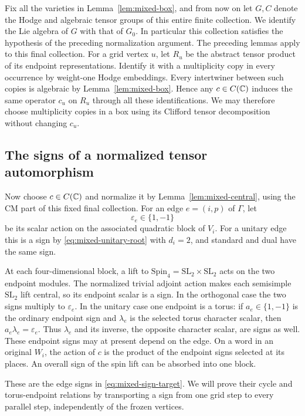 Fix all the varieties in Lemma~\ref{lem:mixed-box}, and from now on
let $G,C$ denote the Hodge and algebraic tensor groups of this entire
finite collection.  We identify the Lie algebra of $G$ with that
of $G_0$.  In particular this collection satisfies the hypothesis
of the preceding normalization argument.  The preceding lemmas apply
to this final collection.
For a grid vertex $u$, let $R_u$ be the abstract tensor product of
its endpoint representations.  Identify it with a multiplicity copy
in every occurrence by weight-one Hodge embeddings.  Every
intertwiner between such copies is algebraic by
Lemma~\ref{lem:mixed-box}.  Hence any $c\in C(\mathbb C)$ induces the
same operator $c_u$ on $R_u$ through all these identifications.
We may therefore choose multiplicity copies in a box using its
Clifford tensor decomposition without changing $c_u$.

\subsection{The signs of a normalized tensor automorphism}

Now choose $c\in C(\mathbb C)$ and normalize it by
Lemma~\ref{lem:mixed-central}, using the CM part of this fixed final
collection.  For an edge $e=(i,p)$ of $\Gamma$,
let
\[
 \varepsilon_e\in\{1,-1\}
\]
be its scalar action on the associated quadratic block of $V_i$.
For a unitary edge this is a sign by
\eqref{eq:mixed-unitary-root} with $d_i=2$, and standard and dual
have the same sign.

At each four-dimensional block, a lift to
$\mathrm{Spin}_4=\mathrm{SL}_2\times\mathrm{SL}_2$ acts on the
two endpoint modules.  The normalized trivial adjoint action makes
each semisimple $\mathrm{SL}_2$ lift central, so its endpoint scalar
is a sign.  In the orthogonal case the two signs multiply to
$\varepsilon_e$.  In the unitary case one endpoint is a torus:
if $a_e\in\{1,-1\}$ is the ordinary endpoint sign and $\lambda_e$
is the selected torus character scalar, then
$a_e\lambda_e=\varepsilon_e$.  Thus $\lambda_e$ and its inverse,
the opposite character scalar, are signs as well.
These endpoint signs may at present
depend on the edge.  On a word in an original $W_i$, the action of
$c$ is the product of the endpoint signs selected at its places.
An overall sign of the spin lift can be absorbed into one block.

These are the edge signs in \eqref{eq:mixed-sign-target}.  We will
prove their cycle and torus-endpoint relations by transporting a sign
from one grid step to every parallel step, independently of the frozen
vertices.

